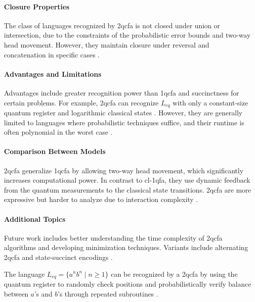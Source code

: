 \paragraph{Closure Properties}  
The class of languages recognized by \gls{2qcfa} is not closed under union or intersection, due to the constraints of the probabilistic error bounds and two-way head movement. However, they maintain closure under reversal and concatenation in specific cases \cite{li2015hybrid}.

\paragraph{Advantages and Limitations}  
Advantages include greater recognition power than \gls{1qcfa} and succinctness for certain problems. For example, \gls{2qcfa} can recognize $L_{eq}$ with only a constant-size quantum register and logarithmic classical states \cite{remscrim2020power}. However, they are generally limited to languages where probabilistic techniques suffice, and their runtime is often polynomial in the worst case \cite{remscrim2020lower}.

\paragraph{Comparison Between Models}  
\gls{2qcfa} generalize \gls{1qcfa} by allowing two-way head movement, which significantly increases computational power. In contrast to \gls{cl-1qfa}, they use dynamic feedback from the quantum measurements to the classical state transitions. \gls{2qcfa} are more expressive but harder to analyze due to interaction complexity \cite{zheng2013state}.

\paragraph{Additional Topics}  
Future work includes better understanding the time complexity of \gls{2qcfa} algorithms and developing minimization techniques. Variants include alternating \gls{2qcfa} and state-succinct encodings \cite{zheng2013state, remscrim2020lower}.

\begin{example}
The language $L_{eq} = \{ a^n b^n \mid n \geq 1 \}$ can be recognized by a \gls{2qcfa} by using the quantum register to randomly check positions and probabilistically verify balance between $a$'s and $b$'s through repeated subroutines \cite{ambainis2002two}.
\end{example}

